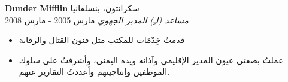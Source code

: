 \foreignlanguage{english}{\textbf{Dunder Mifflin}} \hfill سكرانتون، بنسلفانيا\\
\textit{مساعد (لـِ) المدير الجهوي} \hfill مارس 2005 - مارس 2008\\
\vspace{-1mm}
\begin{itemize}
	\item قدمتُ خِدْمَات للمكتب مثل فنون القتال والرقابة
	\item عملتُ بصفتي عيون المدير الإقليمي وآذانه ويده اليمنى، وأشرفتُ على سلوك الموظفين وإنتاجيتهم وأعددتُ التقارير عنهم.
\end{itemize}